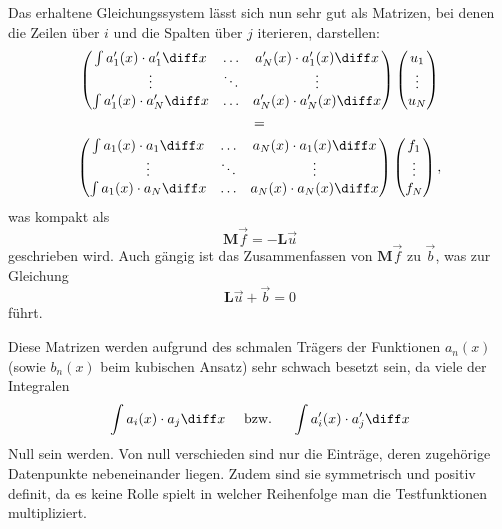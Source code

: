 Das erhaltene Gleichungssystem lässt sich nun sehr gut als Matrizen, bei denen die Zeilen über $i$ und die Spalten über $j$ iterieren, darstellen:
\begin{multline}
    \left(
        \begin{matrix}
            \int a'_1(x) \cdot a'_1 \diff x & \hdots & a'_N(x) \cdot a'_1(x) \diff x \\
            \vdots                          & \ddots & \vdots                        \\
            \int a'_1(x) \cdot a'_N \diff x & \hdots & a'_N(x) \cdot a'_N(x) \diff x \\
        \end{matrix}
    \right)
    \left(
        \begin{matrix}
            u_1 \\
            \vdots \\
            u_N
        \end{matrix}
    \right) \\
    = \\
    \left(
        \begin{matrix}
            \int a_1(x) \cdot a_1 \diff x & \hdots & a_N(x) \cdot a_1(x) \diff x \\
            \vdots                        & \ddots & \vdots                      \\
            \int a_1(x) \cdot a_N \diff x & \hdots & a_N(x) \cdot a_N(x) \diff x \\
        \end{matrix}
    \right)
    \left(
        \begin{matrix}
            f_1 \\
            \vdots \\
            f_N
        \end{matrix}
    \right),
\end{multline}
was kompakt als
\begin{equation}
    \mathbf{M}\vec{f} = -\mathbf{L}\vec{u}
\end{equation}
geschrieben wird.
Auch gängig ist das Zusammenfassen von $\mathbf{M}\vec{f}$ zu $\vec{b}$, was zur Gleichung
\begin{equation}
    \mathbf{L}\vec{u} + \vec{b} = 0
\end{equation}
führt.

Diese Matrizen werden aufgrund des schmalen Trägers der Funktionen $a_n(x)$ (sowie $b_n(x)$ beim kubischen Ansatz) sehr schwach besetzt sein, da viele der Integralen
\begin{equation}
    \int a_i(x) \cdot a_j \diff x \quad 
    \text{ bzw. } 
    \quad \int a'_i(x) \cdot a'_j \diff x 
\end{equation}
Null sein werden.
Von null verschieden sind nur die Einträge, deren zugehörige Datenpunkte nebeneinander liegen.
Zudem sind sie symmetrisch und positiv definit, da es keine Rolle spielt in welcher Reihenfolge man die Testfunktionen multipliziert.

